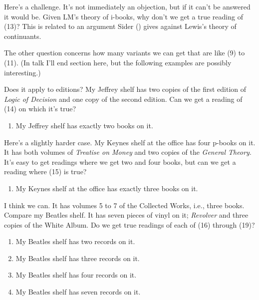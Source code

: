 \documentclass[
  11pt,
  letterpaper,
  DIV=11,
  numbers=noendperiod,
  twoside]{scrartcl}
\providecommand{\tightlist}{%
  \setlength{\itemsep}{0pt}\setlength{\parskip}{0pt}}
\begin{document}
Here's a challenge. It's not immediately an objection, but if it can't
be answered it would be. Given LM's theory of i-books, why don't we get
a true reading of (13)? This is related to an argument Sider
() gives against Lewis's theory of
continuants.

The other question concerns how many variants we can get that are like
(9) to (11). (In talk I'll end section here, but the following examples
are possibly interesting.)

Does it apply to editions? My Jeffrey shelf has two copies of the first
edition of \emph{Logic of Decision} and one copy of the second edition.
Can we get a reading of (14) on which it's true?

\begin{enumerate}
\def\labelenumi{(\arabic{enumi})}
\setcounter{enumi}{13}
\tightlist
\item
  My Jeffrey shelf has exactly two books on it.
\end{enumerate}

Here's a slightly harder case. My Keynes shelf at the office has four
p-books on it. It has both volumes of \emph{Treatise on Money} and two
copies of the \emph{General Theory}. It's easy to get readings where we
get two and four books, but can we get a reading where (15) is true?

\begin{enumerate}
\def\labelenumi{(\arabic{enumi})}
\setcounter{enumi}{14}
\tightlist
\item
  My Keynes shelf at the office has exactly three books on it.
\end{enumerate}

I think we can. It has volumes 5 to 7 of the Collected Works, i.e.,
three books. Compare my Beatles shelf. It has seven pieces of vinyl on
it; \emph{Revolver} and three copies of the White Album. Do we get true
readings of each of (16) through (19)?

\begin{enumerate}
\def\labelenumi{(\arabic{enumi})}
\setcounter{enumi}{15}
\tightlist
\item
  My Beatles shelf has two records on it.
\item
  My Beatles shelf has three records on it.
\item
  My Beatles shelf has four records on it.
\item
  My Beatles shelf has seven records on it.
\end{enumerate}
\end{document}
